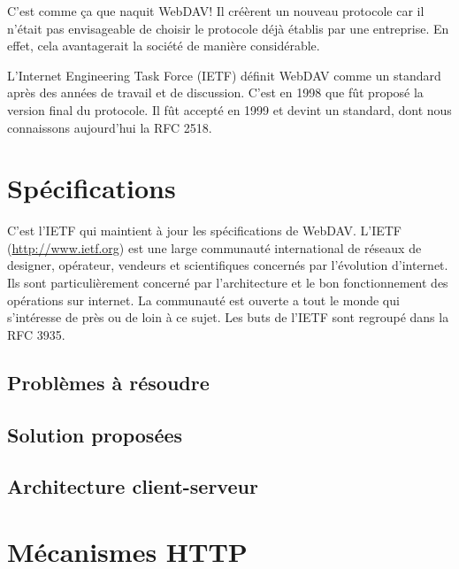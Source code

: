 \documentclass[a4paper, 11pt]{article}
\begin{document}
{		C'est comme ça que naquit WebDAV! Il créèrent un nouveau protocole car il n'était pas envisageable de choisir le protocole déjà établis par une entreprise. En effet, cela avantagerait la société de manière considérable.

		L'Internet Engineering Task Force (IETF) définit WebDAV comme un standard après des années de travail et de discussion. C'est en 1998 que fût proposé la version final du protocole. Il fût accepté en 1999 et devint un standard, dont nous connaissons aujourd'hui la RFC 2518.
		
\section{Spécifications}

	C'est l'IETF qui maintient à jour les spécifications de WebDAV. L'IETF (\url{http://www.ietf.org}) est une large communauté international de réseaux de designer, opérateur, vendeurs et scientifiques concernés par l'évolution d'internet. Ils sont particulièrement concerné par l'architecture et le bon fonctionnement des opérations sur internet. La communauté est ouverte a tout le monde qui s'intéresse de près ou de loin à ce sujet. Les buts de l'IETF sont regroupé dans la RFC 3935.	
	
	\subsection{Problèmes à résoudre}
	
	
	\subsection{Solution proposées}
	
	
	\subsection{Architecture client-serveur}	
	
	
\section{Mécanismes HTTP}

}
\end{document}
